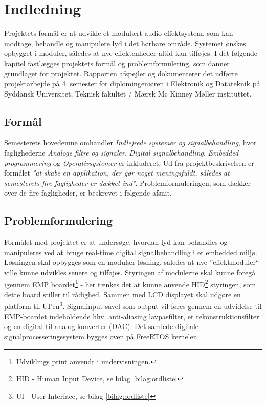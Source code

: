 \chapter{Indledning}
\vspace*{0.5 cm}
Projektets formål er at udvikle et modulært audio effektsystem, som kan modtage, behandle og manipulere lyd i det hørbare område. 
Systemet ønskes opbygget i moduler, således at nye effektenheder altid kan tilføjes. \newline
I det følgende kapitel fastlægges projektets formål og problemformulering, som danner grundlaget for projektet.
Rapporten afspejler og dokumenterer det udførte projektarbejde på 4. semester for diplomingeniøren i Elektronik og Datateknik på Syddansk Universitet, Teknisk fakultet / Mærsk Mc Kinney Møller instituttet.

\section{Formål}
Semesterets hovedemne omhandler \emph{Indlejrede systemer og signalbehandling}, hvor faglighederne \emph{Analoge filtre og signaler}, \emph{Digital signalbehandling}, \emph{Embedded programmering} og \emph{Operativsystemer} er inkluderet.
Ud fra projektbeskrivelsen\cite{projekt_op} er formålet\textit{ "at skabe en applikation, der gør noget meningsfuldt, således at semesterets fire fagligheder er dækket ind"}. \newline
Problemformuleringen, som dækker over de fire fagligheder, er beskrevet i følgende afsnit. 

\section{Problemformulering}
Formålet med projektet er at undersøge, hvordan lyd kan behandles og manipuleres ved at bruge real-time digital signalbehandling i et embedded miljø.
Løsningen skal opbygges som en modulær løsning, således at nye ''effektmoduler`` ville kunne udvikles senere og tilføjes. 
Styringen af modulerne skal kunne foregå igennem EMP boardet\footnote{Udviklings print anvendt i undervisningen.\cite{emp-diagram}} - her tænkes det at kunne anvende HID\footnote{HID - Human Input Device, se bilag \ref{bilag:ordliste}} styringen, som dette board stiller til rådighed. Sammen med LCD displayet skal udgøre en platform til UI'en\footnote{UI - User Interface, se bilag \ref{bilag:ordliste}}. 
Signalinput såvel som output vil føres gennem en udvidelse til EMP-boardet indeholdende hhv. anti-aliasing lavpasfilter, et rekonstruktionsfilter og en digital til analog konverter (DAC).
Det samlede digitale signalprocesseringssystem bygges oven på FreeRTOS kernelen.

